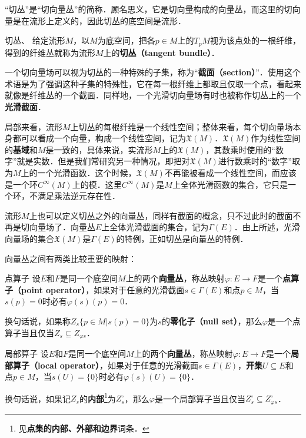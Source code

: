 \begin{issues}
\issueDraft
\end{issues}


“切丛”是“切向量丛”的简称．顾名思义，它是切向量构成的向量丛，而这里的切向量是在流形上定义的，因此切丛的底空间是流形．

\begin{definition}{切丛、}
给定流形$M$，以$M$为底空间，把各$p\in M$上的$T_pM$视为该点处的一根纤维，得到的纤维丛就称为流形$M$上的\textbf{切丛（tangent bundle）}．
\end{definition}

一个切向量场可以视为切丛的一种特殊的子集，称为“\textbf{截面（section）}”．使用这个术语是为了强调这种子集的特殊性，它在每一根纤维上都取且仅取一个点，看起来就像是纤维丛的一个截面．同样地，一个光滑切向量场有时也被称作切丛上的一个\textbf{光滑截面}．

局部来看，流形$M$上切丛的每根纤维是一个线性空间；整体来看，每个切向量场本身都可以看成一个向量，构成一个线性空间，记为$\mathfrak{X}(M)$．$\mathfrak{X}(M)$作为线性空间的\textbf{基域}和$M$是一致的，具体来说，实流形$M$上的$\mathfrak{X}(M)$，其数乘时使用的“数字”就是实数．但是我们常研究另一种情况，即把对$\mathfrak{X}(M)$进行数乘时的“数字”取为$M$上的一个光滑函数．这个时候，$\mathfrak{X}(M)$不再能被看成一个线性空间，而应该是一个环$C^\infty(M)$上的模．这里$C^\infty(M)$是$M$上全体光滑函数的集合，它只是一个环，不满足乘法逆元存在性．

流形$M$上也可以定义切丛之外的向量丛，同样有截面的概念，只不过此时的截面不再是切向量场了．向量丛$E$上全体光滑截面的集合，记为$\Gamma(E)$．由上所述，光滑向量场的集合$\mathfrak{X}(M)$是$\Gamma(E)$的特例，正如切丛是向量丛的特例．

向量丛之间有两类比较重要的映射：

\begin{definition}{点算子}
设$E$和$F$是同一个底空间$M$上的两个\textbf{向量丛}，称丛映射$\varphi:E\rightarrow F$是一个\textbf{点算子（point operator）}，如果对于任意的光滑截面$s\in\Gamma(E)$和点$p\in M$，当$s(p)=0$时必有$\varphi(s)(p)=0$．

换句话说，如果称$Z_s\{p\in M|s(p)=0\}$为$s$的\textbf{零化子（null set）}，那么$\varphi$是一个点算子当且仅当$Z_s\subseteq Z_{\varphi{s}}$．
\end{definition}

\begin{definition}{局部算子}
设$E$和$F$是同一个底空间$M$上的两个\textbf{向量丛}，称丛映射$\varphi:E\rightarrow F$是一个\textbf{局部算子（local operator）}，如果对于任意的光滑截面$s\in\Gamma(E)$，\textbf{开集}$U\subseteq E$和点$p\in M$，当$s(U)=\{0\}$时必有$\varphi(s)(U)=\{0\}$．

换句话说，如果记$Z_s$的\textbf{内部}\footnote{见\textbf{点集的内部、外部和边界}词条．}为$Z_s^\circ$，那么$\varphi$是一个局部算子当且仅当$Z_s^\circ\subseteq Z_{\varphi{s}}^\circ$．
\end{definition}



